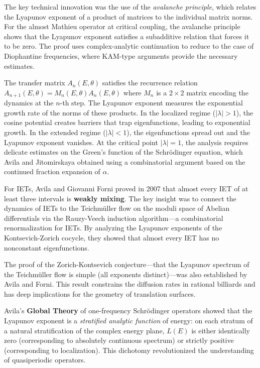 The key technical innovation was the use of the \emph{avalanche principle}, which relates the Lyapunov exponent of a product of matrices to the individual matrix norms. For the almost Mathieu operator at critical coupling, the avalanche principle shows that the Lyapunov exponent satisfies a subadditive relation that forces it to be zero. The proof uses complex-analytic continuation to reduce to the case of Diophantine frequencies, where KAM-type arguments provide the necessary estimates.

The transfer matrix $A_n(E,\theta)$ satisfies the recurrence relation $A_{n+1}(E,\theta) = M_n(E,\theta) A_n(E,\theta)$ where $M_n$ is a $2\times 2$ matrix encoding the dynamics at the $n$-th step. The Lyapunov exponent measures the exponential growth rate of the norms of these products. In the localized regime ($|\lambda|>1$), the cosine potential creates barriers that trap eigenfunctions, leading to exponential growth. In the extended regime ($|\lambda|<1$), the eigenfunctions spread out and the Lyapunov exponent vanishes. At the critical point $|\lambda|=1$, the analysis requires delicate estimates on the Green's function of the Schr\"{o}dinger equation, which Avila and Jitomirskaya obtained using a combinatorial argument based on the continued fraction expansion of $\alpha$.

For IETs, Avila and Giovanni Forni proved in 2007 that almost every IET of at least three intervals is \textbf{weakly mixing}. The key insight was to connect the dynamics of IETs to the Teichm\"{u}ller flow on the moduli space of Abelian differentials via the Rauzy-Veech induction algorithm---a combinatorial renormalization for IETs. By analyzing the Lyapunov exponents of the Kontsevich-Zorich cocycle, they showed that almost every IET has no nonconstant eigenfunctions.

The proof of the Zorich-Kontsevich conjecture---that the Lyapunov spectrum of the Teichm\"{u}ller flow is simple (all exponents distinct)---was also established by Avila and Forni. This result constrains the diffusion rates in rational billiards and has deep implications for the geometry of translation surfaces.

Avila's \textbf{Global Theory} of one-frequency Schr\"{o}dinger operators showed that the Lyapunov exponent is a \emph{stratified analytic function} of energy: on each stratum of a natural stratification of the complex energy plane, $L(E)$ is either identically zero (corresponding to absolutely continuous spectrum) or strictly positive (corresponding to localization). This dichotomy revolutionized the understanding of quasiperiodic operators.

